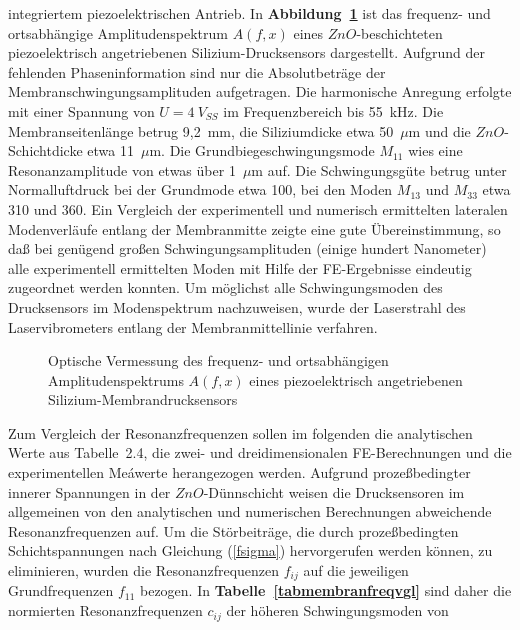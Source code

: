 integriertem piezoelektrischen Antrieb.
%
In {\bf Abbildung~\ref{abbspek}} ist das frequenz- und ortsabhängige
Amplitudenspektrum $A(f,x)$ eines $ZnO$-beschichteten piezoelektrisch
angetriebenen Silizium-Drucksensors dargestellt. Aufgrund der fehlenden
Phaseninformation sind nur die Absolutbeträge der
Membranschwingungsamplituden aufgetragen. Die harmonische Anregung
erfolgte mit einer Spannung von $U = 4~V_{SS}$ im Frequenzbereich bis
55~kHz. Die Membranseitenlänge betrug
9,2~mm, die Siliziumdicke etwa 50~$\mu$m und die $ZnO$-Schichtdicke etwa
11~$\mu$m.
Die Grundbiegeschwingungsmode $M_{11}$ wies eine Resonanzamplitude von
etwas über 1~$\mu$m auf. Die Schwingungsgüte betrug unter Normalluftdruck
bei der Grundmode etwa 100, bei den Moden $M_{13}$ und $M_{33}$ etwa
310 und 360. Ein Vergleich der experimentell und numerisch ermittelten
lateralen Modenverläufe entlang der Membranmitte zeigte eine gute
Übereinstimmung, so daß bei genügend großen Schwingungsamplituden
(einige hundert Nanometer) alle experimentell ermittelten Moden
mit Hilfe der FE-Ergebnisse eindeutig zugeordnet werden konnten.
Um möglichst alle Schwingungsmoden des Drucksensors im Modenspektrum
nachzuweisen, wurde der Laserstrahl des Laservibrometers entlang der
Membranmittellinie verfahren.
\begin{figure}[htb]
\begin{center}

\setabbvsex
\end{center}
\caption{\label{abbspek}
  Optische Vermessung des frequenz- und ortsabhängigen Amplitudenspektrums
  $A(f,x)$ eines piezoelektrisch angetriebenen Silizium-Membrandrucksensors}
\end{figure}
Zum Vergleich der Resonanzfrequenzen sollen im folgenden die analytischen
Werte aus Tabelle~2.4, %
die zwei- und dreidimensionalen FE-Berechnungen und
die experimentellen Meáwerte herangezogen werden. Aufgrund prozeßbedingter
innerer Spannungen in der $ZnO$-Dünnschicht weisen die Drucksensoren
im allgemeinen von den analytischen und numerischen Berechnungen
abweichende Resonanzfrequenzen auf. Um die Störbeiträge, die durch
prozeßbedingten Schichtspannungen nach Gleichung (\ref{fsigma})
hervorgerufen werden können, zu eliminieren, wurden die Resonanzfrequenzen
$f_{ij}$ auf die jeweiligen Grundfrequenzen $f_{11}$ bezogen. In
{\bf Tabelle~\ref{tabmembranfreqvgl}} sind daher die normierten
Resonanzfrequenzen $c_{ij}$ der höheren Schwingungsmoden von
